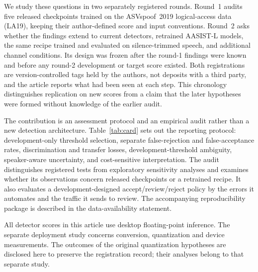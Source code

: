 We study these questions in two separately registered rounds. Round~1 audits five released checkpoints trained on the
ASVspoof~2019 logical-access data (LA19),
keeping their author-defined score and input conventions. Round~2 asks whether the findings extend to current
detectors, retrained AASIST-L models, the same recipe trained and evaluated on silence-trimmed speech, and additional
channel conditions. Its design was frozen after the round-1 findings were known and before any round-2 development
or target score existed. Both registrations are version-controlled tags held by the authors, not deposits with a
third party, and the article reports what had been seen at each step. This chronology distinguishes replication on new scores from a claim that the later
hypotheses were formed without knowledge of the earlier audit.

The contribution is an assessment protocol and an empirical audit rather than a new detection architecture.
Table~\ref{tab:card} sets out the reporting protocol: development-only threshold selection, separate false-rejection
and false-acceptance rates, discrimination and transfer losses, development-threshold ambiguity, speaker-aware
uncertainty, and cost-sensitive interpretation. The audit distinguishes registered tests from exploratory
sensitivity analyses and examines whether its observations concern released checkpoints or a retrained recipe.
It also evaluates a development-designed accept/review/reject policy by the errors it automates and the traffic it
sends to review. The accompanying reproducibility package is described in the data-availability statement.

All detector scores in this article use desktop floating-point inference. The separate deployment study concerns
conversion, quantization and device measurements. The outcomes of the original quantization hypotheses are
disclosed here to preserve the registration record; their analyses belong to that separate study.
